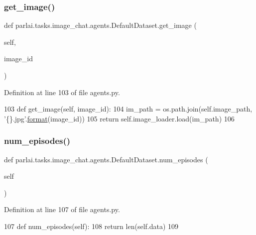 \subsubsection{\texorpdfstring{get\+\_\+image()}{get\_image()}}
{\footnotesize\ttfamily def parlai.\+tasks.\+image\+\_\+chat.\+agents.\+Default\+Dataset.\+get\+\_\+image (\begin{DoxyParamCaption}\item[{}]{self,  }\item[{}]{image\+\_\+id }\end{DoxyParamCaption})}



Definition at line 103 of file agents.\+py.


\begin{DoxyCode}
103     \textcolor{keyword}{def }get\_image(self, image\_id):
104         im\_path = os.path.join(self.image\_path, \textcolor{stringliteral}{'\{\}.jpg'}.\hyperlink{namespaceparlai_1_1chat__service_1_1services_1_1messenger_1_1shared__utils_a32e2e2022b824fbaf80c747160b52a76}{format}(image\_id))
105         \textcolor{keywordflow}{return} self.image\_loader.load(im\_path)
106 
\end{DoxyCode}
\mbox{\label{classparlai_1_1tasks_1_1image__chat_1_1agents_1_1DefaultDataset_afd35ea4ecd0e16f58eceb52317da429e}} 
\subsubsection{\texorpdfstring{num\+\_\+episodes()}{num\_episodes()}}
{\footnotesize\ttfamily def parlai.\+tasks.\+image\+\_\+chat.\+agents.\+Default\+Dataset.\+num\+\_\+episodes (\begin{DoxyParamCaption}\item[{}]{self }\end{DoxyParamCaption})}



Definition at line 107 of file agents.\+py.


\begin{DoxyCode}
107     \textcolor{keyword}{def }num\_episodes(self):
108         \textcolor{keywordflow}{return} len(self.data)
109 
\end{DoxyCode}
\mbox{\label{classparlai_1_1tasks_1_1image__chat_1_1agents_1_1DefaultDataset_a50e9a914fa61e0070403b5806a9c392b}} 
